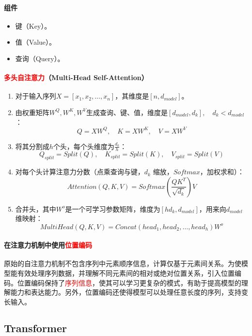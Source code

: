 \documentclass[
12pt, %
a4paper, 
oneside, %
]{scrartcl}
\begin{document}
\paragraph{组件}
\begin{itemize}
\item 键（Key）。
\item 值（Value）。
\item 查询（Query）。
\end{itemize}
\paragraph{\textcolor{red}{多头自注意力}（Multi-Head Self-Attention）}
\begin{enumerate}
\item 对于输入序列$ X = [x_1, x_2, \ldots, x_n] $，其维度是$ [n, d_{model}] $。
\item 由权重矩阵$ W^Q,  W^K, W^V $生成查询、键、值，维度是$ [d_{model}, d_k], \quad d_k < d_{model} $：
$$ Q = X W^Q, \quad K = X W^K, \quad V = X W^V $$
\item 将其分割成$ h $个头，每个头维度为$ \frac{d_k}{h} $：
$$ Q_{split} = Split(Q), \quad K_{split} = Split(K), \quad V_{split} = Split(V) $$
\item 对每个头计算注意力分数（点乘查询与键，$ d_k $ 缩放，$ Softmax $，加权求和）：
$$ Attention(Q, K, V) = Softmax(\frac{QK^T}{\sqrt{d_k}})V $$ 
\item 合并头，其中$ W^o $是一个可学习参数矩阵，维度为$ [hd_k, d_{model}] $，用来向$ d_{model} $维映射：
$$ MultiHead(Q, K, V) = Concat(head_1, head_2, \ldots, head_h)W^o $$ 
\end{enumerate}
\paragraph{在注意力机制中使用\textcolor{red}{位置编码}}
原始的自注意力机制不包含序列中元素顺序信息，计算仅基于元素间关系。为使模型能有效处理序列数据，并理解不同元素间的相对或绝对位置关系，引入位置编码。位置编码保持了\textcolor{red}{序列信息}，使其可以学习更复杂的模式，有助于提高模型的理解能力和表达能力。另外，位置编码还使得模型可以处理任意长度的序列，支持变长输入。
\subsection[Transformer]{Transformer}
\end{document}

